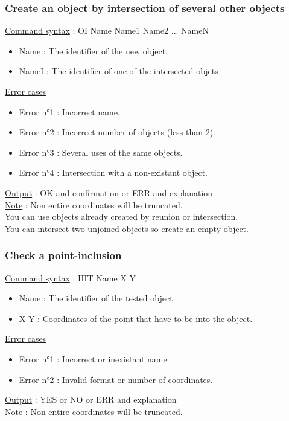 \documentclass[a4paper, 12pts]{article}
\begin{document}
		\subsubsection{Create an object by intersection of several other objects}
			\uline{Command syntax} :
			OI Name Name1 Name2 ... NameN
			\begin{itemize}
				\item Name : The identifier of the new object.
				\item NameI : The identifier of one of the intersected objets
			\end{itemize}
			\uline{Error cases}
			\begin{itemize}
				\item Error n°1 : Incorrect name.
				\item Error n°2 : Incorrect number of objects (less than 2).
				\item Error n°3 : Several uses of the same objects.
				\item Error n°4 : Intersection with a non-existant object.
			\end{itemize}
			\uline{Output} : OK and confirmation or ERR and explanation\\
			\uline{Note} : 
			Non entire coordinates will be truncated.\\
			You can use objects already created by reunion or intersection.\\
			You can intersect two unjoined objects so create an empty object.

		\subsubsection{Check a point-inclusion}
			\uline{Command syntax} :
			HIT Name X Y
			\begin{itemize}
				\item Name : The identifier of the tested object.
				\item X Y : Coordinates of the point that have to be into the object.
			\end{itemize}
			\uline{Error cases}
			\begin{itemize}
				\item Error n°1 : Incorrect or inexistant name.
				\item Error n°2 : Invalid format or number of coordinates.
			\end{itemize}
			\uline{Output} : YES or NO or ERR and explanation\\
			\uline{Note} : 
			Non entire coordinates will be truncated.
\end{document}
